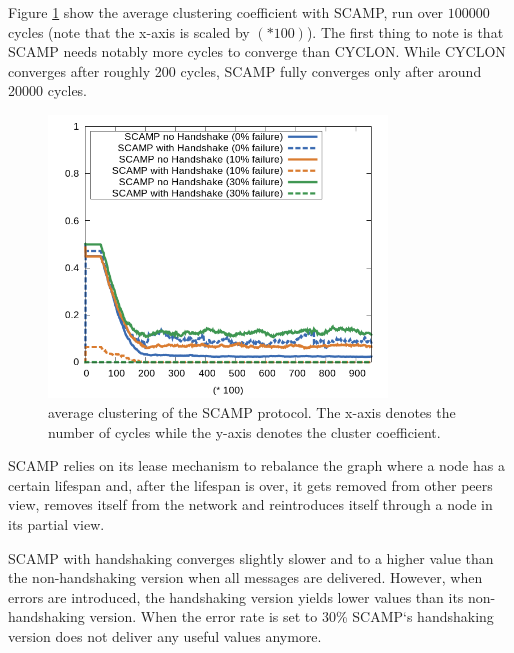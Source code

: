 \documentclass[11pt, english, screen]{report-rd-info}
\begin{document}
Figure \ref{fig:cluster_scamp3} show the average clustering coefficient with SCAMP, run over $100000$ cycles (note that the x-axis is scaled by $(* 100)$).
The first thing to note is that SCAMP needs notably more cycles to converge than CYCLON.
While CYCLON converges after roughly 200 cycles, SCAMP fully converges only after around 20000 cycles.

\begin{figure}
    \centering
    \includegraphics[width=9cm]{Images/statistics/scamp_1000_c2/cluster/all}
    \caption{average clustering of the SCAMP protocol. The x-axis denotes the number of cycles while the y-axis denotes the cluster coefficient.}
    \label{fig:cluster_scamp3}
\end{figure}

SCAMP relies on its lease mechanism to rebalance the graph where a node has a certain lifespan and, after the lifespan is over, it gets removed from other peers view, removes itself from the network and reintroduces itself through a node in its partial view.

SCAMP with handshaking converges slightly slower and to a higher value than the non-handshaking version when all messages are delivered.
However, when errors are introduced, the handshaking version yields lower values than its non-handshaking version.
When the error rate is set to 30\% SCAMP`s handshaking version does not deliver any useful values anymore.

\end{document}

